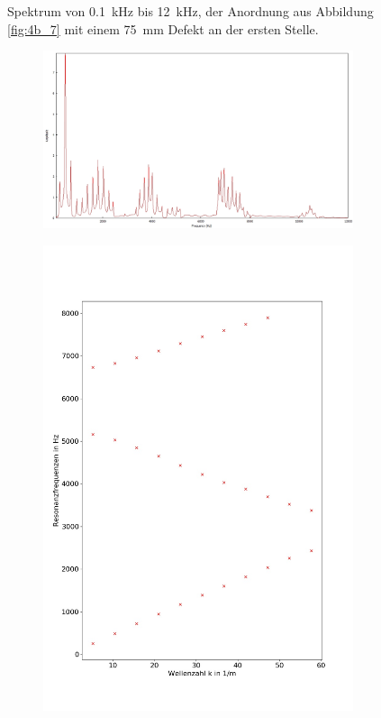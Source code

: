 \begin{figure}
\begin{subfigure}{0.34\textwidth}
\end{subfigure}
\caption{Spektrum von 0.1~kHz bis 12~kHz, der Anordnung aus Abbildung \ref{fig:4b_7} mit einem 75~mm Defekt an der ersten Stelle.}
\label{fig:4b_7_1a}
\end{figure}
\begin{figure}
\centering
\begin{subfigure}{0.65\textwidth}
\includegraphics[width=\textwidth]{content/messungen/Chapter4b/4b_7_1b.jpg}
\end{subfigure}
\begin{subfigure}{0.34\textwidth}
\includegraphics[width=\textwidth]{content/Scripts/4b_7_1b.jpg}

\end{subfigure}
\end{figure}
